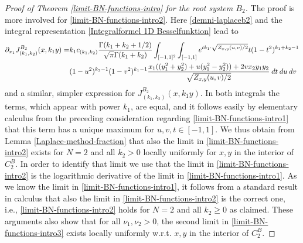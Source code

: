 \documentclass[reqno]{amsart}
\theoremstyle{plain}
\theoremstyle{definition}
\numberwithin{equation}{section}
\begin{document}
\begin{proof}[Proof of Theorem \ref{limit-BN-functions-intro} for the root system $B_2$]
      The proof is more involved for  \eqref{limit-BN-functions-intro2}. Here \eqref{demni-laplaceb2}
      and the integral representation \eqref{Integralformel 1D Besselfunktion}
 lead to
      \begin{align}\label{demni-laplaceb23}    \partial_{x_1}J_{(k_1,k_2)}^{B_2}(x,k_1y)= &k_1 c_{(k_1,k_2)} \frac{\Gamma(k_1+k_2+1/2)}{\sqrt\pi\Gamma(k_1+k_2)} 
\int_{[-1,1]^2}\int_{[-1,1]}
        e^{t k_1\cdot\sqrt{Z_{x,y}(u,v)/2} }t(1-t^2)^{k_1+k_2-1}\\
&(1-u^2)^{k_2-1} (1-v^2)^{k_1-1} \frac{x_1((y_1^2+y_2^2) +u (y_1^2-y_2^2))+ 2v x_2 y_1 y_2}{\sqrt{Z_{x,y}(u,v)/2}} \> dt \> du\> dv\notag
 \end{align}
      and a similar, simpler expression for $J_{(k_1,k_2)}^{B_2}(x,k_1 y)$. In both integrals the terms, which appear with power $k_1$, are equal,
      and it follows easily by elementary calculus from the preceding consideration regarding \eqref{limit-BN-functions-intro1}
      that this term has a unique maximum for 
      $u,v,t\in[-1,1]$. We thus obtain from Lemma \ref{Laplace-method-fraction}  that also the limit in
\eqref{limit-BN-functions-intro2} exists for $N=2$ and all $k_2>0$ locally uniformly for $x,y$ in the interior of 
 $C_2^B$. In order to identify that limit we use that the limit 
in \eqref{limit-BN-functions-intro2} is the logarithmic derivative of the limit in \eqref{limit-BN-functions-intro1}. 
As we know the limit in \eqref{limit-BN-functions-intro1}, it follows from a standard result in
calculus that also the limit in \eqref{limit-BN-functions-intro2} is the correct one, 
i.e., \eqref{limit-BN-functions-intro2} holds for $N=2$ and all $k_2\ge0$ as claimed.
These arguments also show that for all $\nu_1,\nu_2>0$, the second limit in
\eqref{limit-BN-functions-intro3} exists locally uniformly w.r.t. $x,y$ in the interior of $C_2^B$.
\end{proof}
\end{document}
